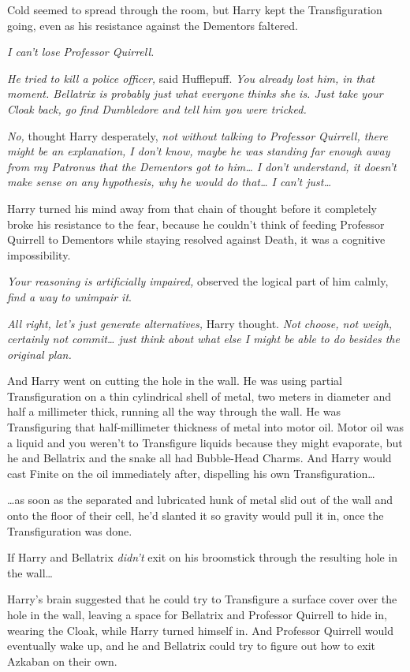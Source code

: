 Cold seemed to spread through the room, but Harry kept the Transfiguration going, even as his resistance against the Dementors faltered.

\emph{I can't lose Professor Quirrell.}

\emph{He tried to kill a police officer,} said Hufflepuff. \emph{You already lost him, in that moment. Bellatrix is probably just what everyone thinks she is. Just take your Cloak back, go find Dumbledore and tell him you were tricked.}

\emph{No,} thought Harry desperately, \emph{not without talking to Professor Quirrell, there might be an explanation, I don't know, maybe he was standing far enough away from my Patronus that the Dementors got to him{\ldots} I don't understand, it doesn't make sense on any hypothesis, why he would do that{\ldots} I can't just{\ldots}}

Harry turned his mind away from that chain of thought before it completely broke his resistance to the fear, because he couldn't think of feeding Professor Quirrell to Dementors while staying resolved against Death, it was a cognitive impossibility.

\emph{Your reasoning is artificially impaired,} observed the logical part of him calmly, \emph{find a way to unimpair it}.

\emph{All right, let's just generate alternatives,} Harry thought. \emph{Not choose, not weigh, certainly not commit{\ldots} just think about what else I might be able to do besides the original plan.}

And Harry went on cutting the hole in the wall. He was using partial Transfiguration on a thin cylindrical shell of metal, two meters in diameter and half a millimeter thick, running all the way through the wall. He was Transfiguring that half-millimeter thickness of metal into motor oil. Motor oil was a liquid and you weren't to Transfigure liquids because they might evaporate, but he and Bellatrix and the snake all had Bubble-Head Charms. And Harry would cast Finite on the oil immediately after, dispelling his own Transfiguration{\ldots}

{\ldots}as soon as the separated and lubricated hunk of metal slid out of the wall and onto the floor of their cell, he'd slanted it so gravity would pull it in, once the Transfiguration was done.

If Harry and Bellatrix \emph{didn't} exit on his broomstick through the resulting hole in the wall{\ldots}

Harry's brain suggested that he could try to Transfigure a surface cover over the hole in the wall, leaving a space for Bellatrix and Professor Quirrell to hide in, wearing the Cloak, while Harry turned himself in. And Professor Quirrell would eventually wake up, and he and Bellatrix could try to figure out how to exit Azkaban on their own.

